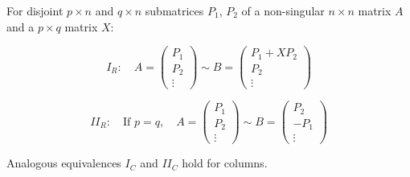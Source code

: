 For disjoint $p \times n$ and $q \times n$ submatrices $P_1$, $P_2$ of a non-singular $n \times n$ matrix $A$ and a $p \times q$ matrix $X$:

$$I_R: \quad A = \begin{pmatrix} P_1 \\ P_2 \\ \vdots \end{pmatrix} \sim B = \begin{pmatrix} P_1 + XP_2 \\ P_2 \\ \vdots \end{pmatrix}$$

$$II_R: \quad \text{If } p = q, \quad A = \begin{pmatrix} P_1 \\ P_2 \\ \vdots \end{pmatrix} \sim B = \begin{pmatrix} P_2 \\ -P_1 \\ \vdots \end{pmatrix}$$

Analogous equivalences $I_C$ and $II_C$ hold for columns.
